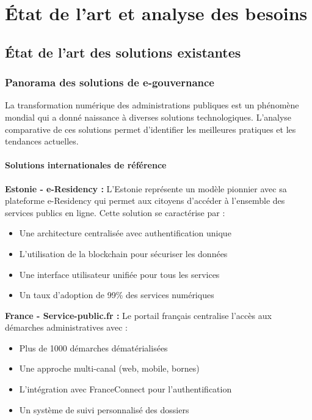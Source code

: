 \chapter{État de l'art et analyse des besoins}

\section{État de l'art des solutions existantes}

\subsection{Panorama des solutions de e-gouvernance}

La transformation numérique des administrations publiques est un phénomène mondial qui a donné naissance à diverses solutions technologiques. L'analyse comparative de ces solutions permet d'identifier les meilleures pratiques et les tendances actuelles.

\subsubsection{Solutions internationales de référence}

\textbf{Estonie - e-Residency :}
L'Estonie représente un modèle pionnier avec sa plateforme e-Residency qui permet aux citoyens d'accéder à l'ensemble des services publics en ligne. Cette solution se caractérise par :
\begin{itemize}
\item Une architecture centralisée avec authentification unique
\item L'utilisation de la blockchain pour sécuriser les données
\item Une interface utilisateur unifiée pour tous les services
\item Un taux d'adoption de 99\% des services numériques
\end{itemize}

\textbf{France - Service-public.fr :}
Le portail français centralise l'accès aux démarches administratives avec :
\begin{itemize}
\item Plus de 1000 démarches dématérialisées
\item Une approche multi-canal (web, mobile, bornes)
\item L'intégration avec FranceConnect pour l'authentification
\item Un système de suivi personnalisé des dossiers
\end{itemize}

